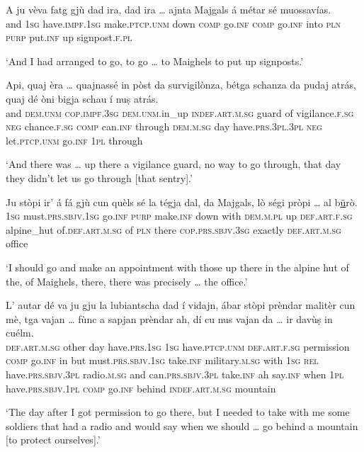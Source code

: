 \begin{linenumbers}
\gll A ju vèva fatg gjù dad ira, dad ira … ajnta Majgals á métar sé muossavías.\\
and \textsc{1sg} have.\textsc{impf.1sg} make.\textsc{ptcp.unm} down \textsc{comp}  go.\textsc{inf} \textsc{comp} go.\textsc{inf} {} into \textsc{pln} \textsc{purp} put.\textsc{inf} up signpost.\textsc{f.pl} \\
\end{linenumbers}
\medskip
\glt `And I had arranged to go, to go … to Maighels to put up signposts.'
\medskip

\begin{linenumbers}
\gll  Api, quaj èra … quajnassé in pòst da survigilònza, bétga schanza da pudaj atrás, quaj dé òni bigja schau í nuṣ atrás.\\
and \textsc{dem.unm} \textsc{cop.impf.3sg} {} \textsc{dem.unm}.in\_up \textsc{indef.art.m.sg} guard of vigilance.\textsc{f.sg} \textsc{neg} chance.\textsc{f.sg} \textsc{comp} can.\textsc{inf} through \textsc{dem.m.sg} day have.\textsc{prs.3pl.3pl} \textsc{neg} let.\textsc{ptcp.unm} go.\textsc{inf} \textsc{1pl} through  \\
\end{linenumbers}
\medskip
\glt `And there was … up there a vigilance guard, no way to go through, that day they didn’t let us go through [that sentry].'
\medskip

\begin{linenumbers}
\gll Ju stòpi ir’ á fá gjù cun quèls sé la tégja dal, da Majgals, lò ségi pròpi … al b\underline{ü}rò.   \\
 \textsc{1sg} must.\textsc{prs.sbjv.1sg} go.\textsc{inf} \textsc{purp} make.\textsc{inf} down with \textsc{dem.m.pl} up \textsc{def.art.f.sg} alpine\_hut of.\textsc{def.art.m.sg} of \textsc{pln} there \textsc{cop.prs.sbjv.3sg} exactly  {} \textsc{def.art.m.sg} office\\
\end{linenumbers}
\medskip
\glt `I should go and make an appointment with those up there in the alpine hut of the, of Maighels, there, there was precisely … the office.'
\medskip

\begin{linenumbers}
\gll  L’ autar dé va ju gju la lubiantscha dad í vidajn, ábar stòpi prèndar malitèr cun mè, tga vajan … fùnc a sapjan prèndar ah, dí cu nus vajan da … ir davùṣ in cuélm.  \\
 \textsc{def.art.m.sg} other day have.\textsc{prs.1sg} \textsc{1sg} have.\textsc{ptcp.unm} \textsc{def.art.f.sg} permission \textsc{comp} go.\textsc{inf} in but must.\textsc{prs.sbjv.1sg}  take.\textsc{inf} military.\textsc{m.sg} with \textsc{1sg} \textsc{rel} have.\textsc{prs.sbjv.3pl} {} radio.\textsc{m.sg} and can.\textsc{prs.sbjv.3pl} take.\textsc{inf} ah say.\textsc{inf} when \textsc{1pl} have.\textsc{prs.sbjv.1pl} \textsc{comp} {} go.\textsc{inf} behind \textsc{indef.art.m.sg} mountain\\
\end{linenumbers}
\medskip
\glt `The day after I got permission to go there, but I needed to take with me some soldiers that had a radio and would say when we should … go behind a mountain [to protect ourselves].'
\medskip

